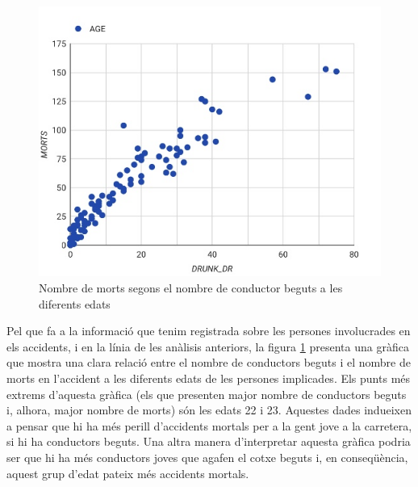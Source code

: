 \documentclass[12pt,longbibliography]{article}
\theoremstyle{definition}
\theoremstyle{remark}
\begin{document}
\begin{figure}[H]
\begin{center}
\includegraphics[width=12.5cm]{Graph12}
\end{center}
\caption{Nombre de morts segons el nombre de conductor beguts a les diferents edats}
\label{fig:G3}
\end{figure}


Pel que fa a la informació que tenim registrada sobre les persones involucrades en els accidents, i en la línia de les anàlisis anteriors, la figura  \ref{fig:G3} presenta una gràfica que mostra una clara relació entre el nombre de conductors beguts i el nombre de morts en l'accident a les diferents edats de les persones implicades. Els punts més extrems d'aquesta gràfica (els que presenten major nombre de conductors beguts i, alhora, major nombre de morts) són les edats 22 i 23. Aquestes dades indueixen a pensar que hi ha més perill d'accidents mortals per a la gent jove a la carretera, si hi ha conductors beguts. Una altra manera d'interpretar aquesta gràfica podria ser que hi ha més conductors joves que agafen el cotxe beguts i, en conseqüència, aquest grup d'edat pateix més accidents mortals.
\end{document}

